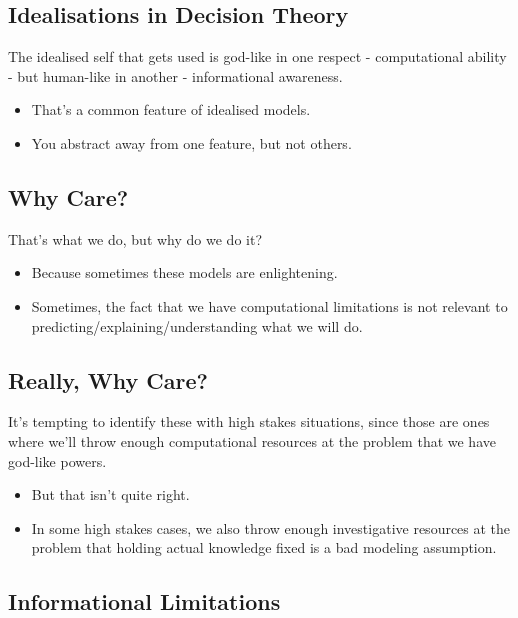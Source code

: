 \documentclass[
  letterpaper,
  DIV=11,
  numbers=noendperiod]{scrartcl}
\providecommand{\tightlist}{%
  \setlength{\itemsep}{0pt}\setlength{\parskip}{0pt}}\usepackage{longtable,booktabs,array}
\begin{document}
\subsection{Idealisations in Decision
Theory}\label{idealisations-in-decision-theory-2}

The idealised self that gets used is god-like in one respect -
computational ability - but human-like in another - informational
awareness.

\begin{itemize}
\tightlist
\item
  That's a common feature of idealised models.
\item
  You abstract away from one feature, but not others.
\end{itemize}

\subsection{Why Care?}\label{why-care}

That's what we do, but why do we do it?

\begin{itemize}
\tightlist
\item
  Because sometimes these models are enlightening.
\item
  Sometimes, the fact that we have computational limitations is not
  relevant to predicting/explaining/understanding what we will do.
\end{itemize}

\subsection{Really, Why Care?}\label{really-why-care}

It's tempting to identify these with high stakes situations, since those
are ones where we'll throw enough computational resources at the problem
that we have god-like powers.

\begin{itemize}
\tightlist
\item
  But that isn't quite right.
\item
  In some high stakes cases, we also throw enough investigative
  resources at the problem that holding actual knowledge fixed is a bad
  modeling assumption.
\end{itemize}

\subsection{Informational Limitations}\label{informational-limitations}
\end{document}
